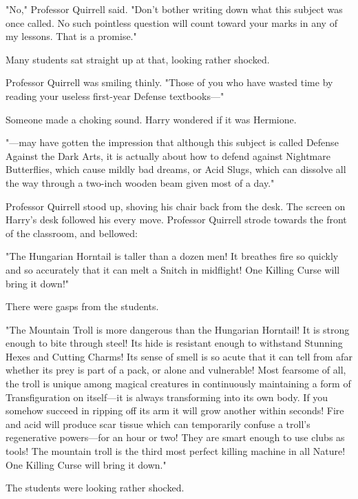 "No," Professor Quirrell said. "Don't bother writing down what this subject was
once called. No such pointless question will count toward your marks in any of
my lessons. That is a promise."

Many students sat straight up at that, looking rather shocked.

Professor Quirrell was smiling thinly. "Those of you who have wasted time by
reading your useless first-year Defense textbooks\mbox{---}"

Someone made a choking sound. Harry wondered if it was Hermione.

"---may have gotten the impression that although this subject is called Defense
Against the Dark Arts, it is actually about how to defend against Nightmare
Butterflies, which cause mildly bad dreams, or Acid Slugs, which can dissolve
all the way through a two-inch wooden beam given most of a day."

Professor Quirrell stood up, shoving his chair back from the desk. The screen
on Harry's desk followed his every move. Professor Quirrell strode towards the
front of the classroom, and bellowed:

"The Hungarian Horntail is taller than a dozen men! It breathes fire so quickly
and so accurately that it can melt a Snitch in midflight! One Killing Curse
will bring it down!"

There were gasps from the students.

"The Mountain Troll is more dangerous than the Hungarian Horntail! It is strong
enough to bite through steel! Its hide is resistant enough to withstand
Stunning Hexes and Cutting Charms! Its sense of smell is so acute that it can
tell from afar whether its prey is part of a pack, or alone and vulnerable!
Most fearsome of all, the troll is unique among magical creatures in
continuously maintaining a form of Transfiguration on itself---it is always
transforming into its own body. If you somehow succeed in ripping off its arm
it will grow another within seconds! Fire and acid will produce scar tissue
which can temporarily confuse a troll's regenerative powers---for an hour or
two! They are smart enough to use clubs as tools! The mountain troll is the
third most perfect killing machine in all Nature! One Killing Curse will bring
it down."

The students were looking rather shocked.

